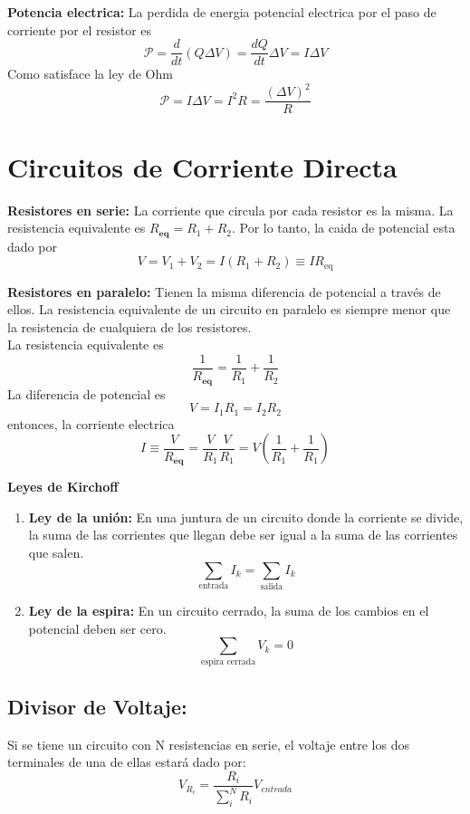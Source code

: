 \documentclass[a4paper, 10pt]{article}
\begin{document}
\begin{multicols*}{2}
	\textbf{Potencia electrica: }La perdida de energia potencial electrica por el paso de corriente por el resistor es
	$$\mathcal{P}=\frac{d}{dt}(Q\Delta V) =\frac{dQ}{dt}\Delta V=I\Delta V$$
	Como satisface la ley de Ohm
	$$\mathcal{P}=I\Delta V =I^2R=\frac{(\Delta V)^2}{R}$$
	    
	\section{Circuitos de Corriente Directa}
	\textbf{Resistores en serie:} La corriente que circula por cada resistor es la misma.
	La resistencia equivalente es $R_{\textbf{eq}}=R_1+R_2$. Por lo tanto, la caida de potencial esta dado por
	$$V=V_1+V_2=I(R_1+R_2)\equiv IR_{\text{eq}}$$
	    
	\textbf{Resistores en paralelo:} Tienen la misma diferencia de potencial a través de ellos. La resistencia equivalente de un circuito en paralelo es siempre menor que la resistencia de cualquiera de los resistores.\\La resistencia equivalente es $$\frac{1}{R_{\textbf{eq}}}=\frac{1}{R_1}+\frac{1}{R_2}$$La diferencia de potencial es
	$$V=I_1R_1=I_2R_2$$
	entonces, la corriente electrica
	$$I\equiv \frac{V}{R_{\textbf{eq}}}=\frac{V}{R_1}\frac{V}{R_1}=V(\frac{1}{R_1}+\frac{1}{R_1})$$
	    
	\textbf{Leyes de Kirchoff}
	\begin{enumerate}
		\item \textbf{Ley de la unión:} En una juntura de un circuito donde la corriente se divide, la suma de las corrientes que llegan debe ser igual a la suma de las corrientes que salen. 
		      $$\sum_{\text{entrada}} I_k = \sum_{\text{salida}} I_k$$
		\item \textbf{Ley de la espira:} En un circuito cerrado, la suma de los cambios en el potencial deben ser cero.
		      $$\sum_{\text{espira cerrada}} V_k=0$$
		              
	\end{enumerate}

  \subsection{Divisor de Voltaje:}
    Si se tiene un circuito con N resistencias en serie, el voltaje entre los dos terminales
    de una de ellas
    estará dado por:
    \begin{equation}
      V_{R_i} = \frac{R_i}{\sum_i^N R_i}V_{entrada}
    \end{equation}
      

\end{multicols*}
\end{document}
